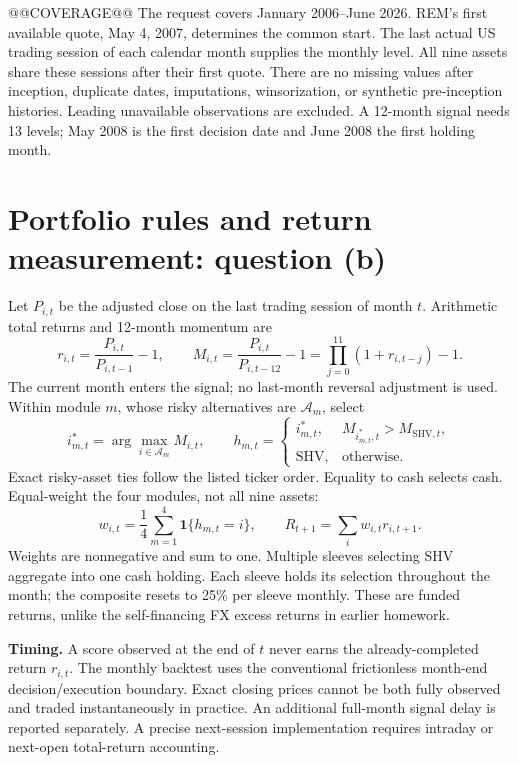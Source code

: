 \documentclass[11pt,letterpaper]{article}
\begin{document}
@@COVERAGE@@
The request covers January 2006--June 2026. REM's first available quote, May 4, 2007, determines the common start. The last actual US trading session of each calendar month supplies the monthly level. All nine assets share these sessions after their first quote. There are no missing values after inception, duplicate dates, imputations, winsorization, or synthetic pre-inception histories. Leading unavailable observations are excluded. A 12-month signal needs 13 levels; May 2008 is the first decision date and June 2008 the first holding month.

\newpage
\section{Portfolio rules and return measurement: question (b)}
Let \(P_{i,t}\) be the adjusted close on the last trading session of month \(t\). Arithmetic total returns and 12-month momentum are
\[
r_{i,t}=\frac{P_{i,t}}{P_{i,t-1}}-1,\qquad
M_{i,t}=\frac{P_{i,t}}{P_{i,t-12}}-1
       =\prod_{j=0}^{11}(1+r_{i,t-j})-1.
\]
The current month enters the signal; no last-month reversal adjustment is used. Within module \(m\), whose risky alternatives are \(\mathcal A_m\), select
\[
i^*_{m,t}=\arg\max_{i\in\mathcal A_m}M_{i,t},\qquad
h_{m,t}=
\begin{cases}
i^*_{m,t},&M_{i^*_{m,t},t}>M_{\mathrm{SHV},t},\\
\mathrm{SHV},&\text{otherwise}.
\end{cases}
\]
Exact risky-asset ties follow the listed ticker order. Equality to cash selects cash. Equal-weight the four modules, not all nine assets:
\[
w_{i,t}=\frac14\sum_{m=1}^{4}\mathbf1\{h_{m,t}=i\},\qquad
R_{t+1}=\sum_i w_{i,t}r_{i,t+1}.
\]
Weights are nonnegative and sum to one. Multiple sleeves selecting SHV aggregate into one cash holding. Each sleeve holds its selection throughout the month; the composite resets to 25\% per sleeve monthly. These are funded returns, unlike the self-financing FX excess returns in earlier homework.

\textbf{Timing.} A score observed at the end of \(t\) never earns the already-completed return \(r_{i,t}\). The monthly backtest uses the conventional frictionless month-end decision/execution boundary. Exact closing prices cannot be both fully observed and traded instantaneously in practice. An additional full-month signal delay is reported separately. A precise next-session implementation requires intraday or next-open total-return accounting.
\end{document}
